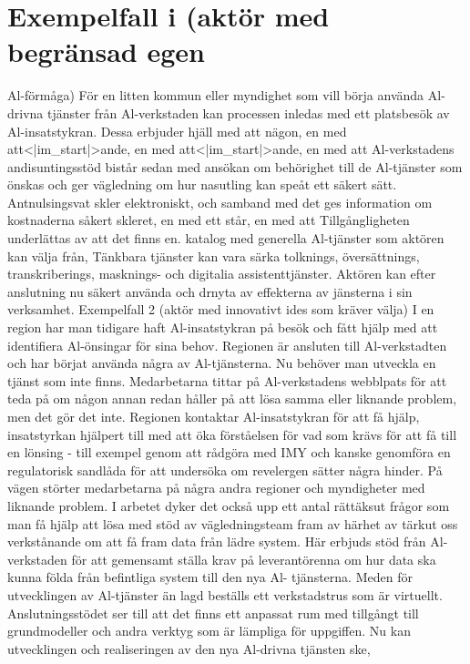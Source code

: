 {{{{{{{{{{{{{{{{\section*{Exempelfall i (aktör med begränsad egen}
Al-förmåga)
För en litten kommun eller myndighet som vill börja
använda Al-drivna tjänster från Al-verkstaden
kan processen inledas med ett platsbesök av
Al-insatstykran. Dessa erbjuder hjäll med att
nägon, en med att<|im_start|>ande, en med att<|im_start|>ande, en med att
Al-verkstadens andisuntingsstöd bistår sedan med
ansökan om behörighet till de Al-tjänster som önskas
och ger vägledning om hur nasutling kan speåt ett
säkert sätt. Antnulsingsvat skler elektroniskt, och
samband med det ges information om kostnaderna
såkert skleret, en med ett står, en med att
Tillgångligheten underlättas av att det finns en.
katalog med generella Al-tjänster som aktören kan
välja från, Tänkbara tjänster kan vara särka tolknings,
översättnings, transkriberings, masknings- och
digitalia assistenttjänster. Aktören kan efter anslutning
nu säkert använda och drnyta av effekterna av
jänsterna i sin verksamhet.
Exempelfall 2 (aktör med innovativt ides som kräver
välja)
I en region har man tidigare haft Al-insatstykran på
besök och fått hjälp med att identifiera Al-önsingar
för sina behov. Regionen är ansluten till Al-verkstadten
och har börjat använda några av Al-tjänsterna. Nu
behöver man utveckla en tjänst som inte finns.
Medarbetarna tittar på Al-verkstadens webblpats för att teda på om någon annan redan håller på att lösa
samma eller liknande problem, men det gör det inte.
Regionen kontaktar Al-insatstykran för att få hjälp,
insatstyrkan hjälpert till med att öka förståelsen för
vad som krävs för att få till en lönsing - till exempel
genom att rådgöra med IMY och kanske genomföra
en regulatorisk sandlåda för att undersöka om
revelergen sätter några hinder. På vägen störter
medarbetarna på några andra regioner och
myndigheter med liknande problem.
I arbetet dyker det också upp ett antal rättäksut
frågor som man få hjälp att lösa med stöd av
vägledningsteam fram av härhet av tärkut oss
verkstånande om att få fram data från lädre
system. Här erbjuds stöd från Al-verkstaden för att
gemensamt ställa krav på leverantörenna om hur data
ska kunna földa från befintliga system till den nya Al-
tjänsterna.
Meden för utvecklingen av Al-tjänster än
lagd beställs ett verkstadstrus som är virtuellt.
Anslutningsstödet ser till att det finns ett anpassat
rum med tillgångt till grundmodeller och andra verktyg
som är lämpliga för uppgiffen. Nu kan utvecklingen
och realiseringen av den nya Al-drivna tjänsten ske,
}}}}}}}}}}}}}}}}
